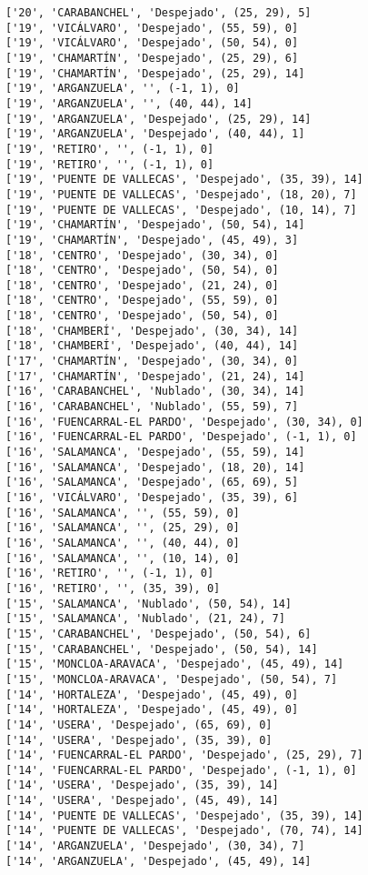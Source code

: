 \documentclass[11pt]{article}
\begin{document}
\begin{Verbatim}[commandchars=\\\{\}]
['20', 'CARABANCHEL', 'Despejado', (25, 29), 5]
['19', 'VICÁLVARO', 'Despejado', (55, 59), 0]
['19', 'VICÁLVARO', 'Despejado', (50, 54), 0]
['19', 'CHAMARTÍN', 'Despejado', (25, 29), 6]
['19', 'CHAMARTÍN', 'Despejado', (25, 29), 14]
['19', 'ARGANZUELA', '', (-1, 1), 0]
['19', 'ARGANZUELA', '', (40, 44), 14]
['19', 'ARGANZUELA', 'Despejado', (25, 29), 14]
['19', 'ARGANZUELA', 'Despejado', (40, 44), 1]
['19', 'RETIRO', '', (-1, 1), 0]
['19', 'RETIRO', '', (-1, 1), 0]
['19', 'PUENTE DE VALLECAS', 'Despejado', (35, 39), 14]
['19', 'PUENTE DE VALLECAS', 'Despejado', (18, 20), 7]
['19', 'PUENTE DE VALLECAS', 'Despejado', (10, 14), 7]
['19', 'CHAMARTÍN', 'Despejado', (50, 54), 14]
['19', 'CHAMARTÍN', 'Despejado', (45, 49), 3]
['18', 'CENTRO', 'Despejado', (30, 34), 0]
['18', 'CENTRO', 'Despejado', (50, 54), 0]
['18', 'CENTRO', 'Despejado', (21, 24), 0]
['18', 'CENTRO', 'Despejado', (55, 59), 0]
['18', 'CENTRO', 'Despejado', (50, 54), 0]
['18', 'CHAMBERÍ', 'Despejado', (30, 34), 14]
['18', 'CHAMBERÍ', 'Despejado', (40, 44), 14]
['17', 'CHAMARTÍN', 'Despejado', (30, 34), 0]
['17', 'CHAMARTÍN', 'Despejado', (21, 24), 14]
['16', 'CARABANCHEL', 'Nublado', (30, 34), 14]
['16', 'CARABANCHEL', 'Nublado', (55, 59), 7]
['16', 'FUENCARRAL-EL PARDO', 'Despejado', (30, 34), 0]
['16', 'FUENCARRAL-EL PARDO', 'Despejado', (-1, 1), 0]
['16', 'SALAMANCA', 'Despejado', (55, 59), 14]
['16', 'SALAMANCA', 'Despejado', (18, 20), 14]
['16', 'SALAMANCA', 'Despejado', (65, 69), 5]
['16', 'VICÁLVARO', 'Despejado', (35, 39), 6]
['16', 'SALAMANCA', '', (55, 59), 0]
['16', 'SALAMANCA', '', (25, 29), 0]
['16', 'SALAMANCA', '', (40, 44), 0]
['16', 'SALAMANCA', '', (10, 14), 0]
['16', 'RETIRO', '', (-1, 1), 0]
['16', 'RETIRO', '', (35, 39), 0]
['15', 'SALAMANCA', 'Nublado', (50, 54), 14]
['15', 'SALAMANCA', 'Nublado', (21, 24), 7]
['15', 'CARABANCHEL', 'Despejado', (50, 54), 6]
['15', 'CARABANCHEL', 'Despejado', (50, 54), 14]
['15', 'MONCLOA-ARAVACA', 'Despejado', (45, 49), 14]
['15', 'MONCLOA-ARAVACA', 'Despejado', (50, 54), 7]
['14', 'HORTALEZA', 'Despejado', (45, 49), 0]
['14', 'HORTALEZA', 'Despejado', (45, 49), 0]
['14', 'USERA', 'Despejado', (65, 69), 0]
['14', 'USERA', 'Despejado', (35, 39), 0]
['14', 'FUENCARRAL-EL PARDO', 'Despejado', (25, 29), 7]
['14', 'FUENCARRAL-EL PARDO', 'Despejado', (-1, 1), 0]
['14', 'USERA', 'Despejado', (35, 39), 14]
['14', 'USERA', 'Despejado', (45, 49), 14]
['14', 'PUENTE DE VALLECAS', 'Despejado', (35, 39), 14]
['14', 'PUENTE DE VALLECAS', 'Despejado', (70, 74), 14]
['14', 'ARGANZUELA', 'Despejado', (30, 34), 7]
['14', 'ARGANZUELA', 'Despejado', (45, 49), 14]

\end{Verbatim}
\end{document}

